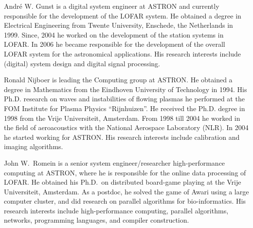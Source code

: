 \documentclass[journal]{IEEEtran}
\begin{document}
% 

\begin{IEEEbiography}{Andr\'{e} W. Gunst}
is a digital system engineer at ASTRON and currently responsible for the development of the LOFAR system. He obtained a degree in Electrical Engineering from Twente University, Enschede, the Netherlands in 1999. Since, 2004 he worked on the development of the station systems in LOFAR. In 2006 he became responsible for the development of the overall LOFAR system for the astronomical applications. His research interests include (digital) system design and digital signal processing.
\end{IEEEbiography}

\begin{IEEEbiography}{Ronald Nijboer}
is leading the Computing group at ASTRON. He obtained a degree in Mathematics from the Eindhoven University of Technology in 1994. His Ph.D. research on waves and instabilities of flowing  plasmas he performed at the FOM Institute for Plasma Physics ``Rijnhuizen''. He received the Ph.D. degree in 1998 from the Vrije Universiteit, Amsterdam. From 1998 till 2004 he worked in the field of aeroacoustics with the National Aerospace Laboratory (NLR). In 2004 he started working for ASTRON. His research interests include calibration and imaging algorithms.  
\end{IEEEbiography}




\begin{IEEEbiography}{John W.\ Romein}
is a senior system engineer/researcher high-performance
computing at ASTRON, where he is responsible for the online data processing
of LOFAR.
He obtained his Ph.D.\ on distributed board-game playing at the Vrije
Universiteit, Amsterdam.
As a postdoc, he solved the game of Awari using a large computer cluster,
and did research on parallel algorithms for bio-informatics.
His research interests include high-performance computing, parallel algorithms,
networks, programming languages, and compiler construction.
\end{IEEEbiography}
\end{document}
